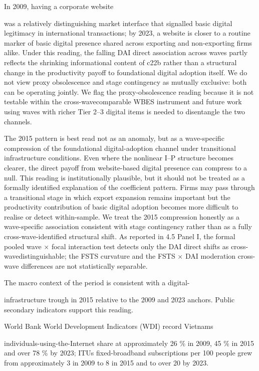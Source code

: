 \documentclass[12pt,a4paper]{article}
\begin{document}
In 2009, having a corporate website

was a relatively distinguishing market interface that signalled basic
digital legitimacy in international transactions; by 2023, a website is
closer to a routine marker of basic digital presence shared across
exporting and non-exporting firms alike. Under this reading, the falling
DAI direct association across waves partly reflects the shrinking
informational content of c22b rather than a structural change in the
productivity payoff to foundational digital adoption itself. We do not
view proxy obsolescence and stage contingency as mutually exclusive:
both can be operating jointly. We flag the proxy-obsolescence reading
because it is not testable within the cross-wavecomparable WBES
instrument and future work using waves with richer Tier 2--3 digital
items is needed to disentangle the two channels.

The 2015 pattern is best read not as an anomaly, but as a wave-specific
compression of the foundational digital-adoption channel under
transitional infrastructure conditions. Even where the nonlinear I--P
structure becomes clearer, the direct payoff from website-based digital
presence can compress to a null. This reading is institutionally
plausible, but it should not be treated as a formally identified
explanation of the coefficient pattern. Firms may pass through a
transitional stage in which export expansion remains important but the
productivity contribution of basic digital adoption becomes more
difficult to realise or detect within-sample. We treat the 2015
compression honestly as a wave-specific association consistent with
stage contingency rather than as a fully cross-wave-identified
structural shift. As reported in 4.5 Panel I, the formal pooled wave ×
focal interaction test detects only the DAI direct shifts as
cross-wavedistinguishable; the FSTS curvature and the FSTS × DAI
moderation cross-wave differences are not statistically separable.

The macro context of the period is consistent with a digital-

infrastructure trough in 2015 relative to the 2009 and 2023 anchors.
Public secondary indicators support this reading.

World Bank World Development Indicators (WDI) record
Vietnam\textquotesingle s

individuals-using-the-Internet share at approximately 26 \% in 2009, 45
\% in 2015 and over 78 \% by 2023; ITU\textquotesingle s fixed-broadband
subscriptions per 100 people grew from approximately 3 in 2009 to 8 in
2015 and to over 20 by 2023.
\end{document}
